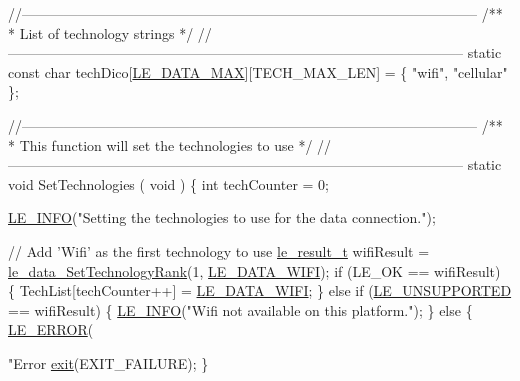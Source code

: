 \begin{DoxyCodeInclude}
\textcolor{comment}{//--------------------------------------------------------------------------------------------------}\textcolor{comment}{}
\textcolor{comment}{/**}
\textcolor{comment}{ *  List of technology strings}
\textcolor{comment}{ */}
\textcolor{comment}{//--------------------------------------------------------------------------------------------------}
\textcolor{keyword}{static} \textcolor{keyword}{const} \textcolor{keywordtype}{char} techDico[\hyperlink{le__data__interface_8h_a245d12b4d3367d81c0fc8b76fa60674aa5143acc7e16842ac4cf33afa34b50c0b}{LE\_DATA\_MAX}][TECH\_MAX\_LEN] = \{
    \textcolor{stringliteral}{"wifi"},
    \textcolor{stringliteral}{"cellular"}
\};

\textcolor{comment}{//--------------------------------------------------------------------------------------------------}\textcolor{comment}{}
\textcolor{comment}{/**}
\textcolor{comment}{ *  This function will set the technologies to use}
\textcolor{comment}{ */}
\textcolor{comment}{//--------------------------------------------------------------------------------------------------}
\textcolor{keyword}{static} \textcolor{keywordtype}{void} SetTechnologies
(
    \textcolor{keywordtype}{void}
)
\{
    \textcolor{keywordtype}{int} techCounter = 0;

    \hyperlink{le__log_8h_a23e6d206faa64f612045d688cdde5808}{LE\_INFO}(\textcolor{stringliteral}{"Setting the technologies to use for the data connection."});

    \textcolor{comment}{// Add 'Wifi' as the first technology to use}
    \hyperlink{le__basics_8h_a1cca095ed6ebab24b57a636382a6c86c}{le\_result\_t} wifiResult = \hyperlink{le__data__interface_8h_aeb5f71861d30b8442b2c11ca34bc73c4}{le\_data\_SetTechnologyRank}(1, 
      \hyperlink{le__data__interface_8h_a245d12b4d3367d81c0fc8b76fa60674aadad1d51bb56b95e60bdae2656be89904}{LE\_DATA\_WIFI});
    \textcolor{keywordflow}{if} (LE\_OK == wifiResult)
    \{
        TechList[techCounter++] = \hyperlink{le__data__interface_8h_a245d12b4d3367d81c0fc8b76fa60674aadad1d51bb56b95e60bdae2656be89904}{LE\_DATA\_WIFI};
    \}
    \textcolor{keywordflow}{else} \textcolor{keywordflow}{if} (\hyperlink{le__basics_8h_a1cca095ed6ebab24b57a636382a6c86ca5377262702e8434207b03533259e0c5f}{LE\_UNSUPPORTED} == wifiResult)
    \{
        \hyperlink{le__log_8h_a23e6d206faa64f612045d688cdde5808}{LE\_INFO}(\textcolor{stringliteral}{"Wifi not available on this platform."});
    \}
    \textcolor{keywordflow}{else}
    \{
        \hyperlink{le__log_8h_a353590f91b3143a7ba3a416ae5a50c3d}{LE\_ERROR}(\textcolor{stringliteral}{"Error %
        \hyperlink{app_stop_client_8c_a310220604a584e112ba8f7aa3dfe23f1}{exit}(EXIT\_FAILURE);
    \}

}
\end{DoxyCodeInclude}
